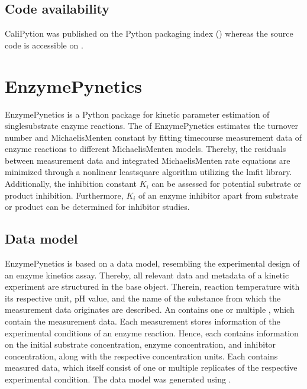 \documentclass[letterpaper,12pt,english]{jupyterBook}
\begin{document}
\subsection{Code availability}
\label{\detokenize{methods:code-availability}}
\sphinxAtStartPar
CaliPytion was published on the Python packaging index () whereas the source code is accessible on .


\section{EnzymePynetics}
\label{\detokenize{methods:enzymepynetics}}\label{\detokenize{methods:method-enzymepynetics}}
\sphinxAtStartPar
EnzymePynetics is a Python package for kinetic parameter estimation of single\sphinxhyphen{}substrate enzyme reactions. The  of EnzymePynetics estimates the turnover number and Michaelis\sphinxhyphen{}Menten constant by fitting time\sphinxhyphen{}course measurement data of enzyme reactions to different Michaelis\sphinxhyphen{}Menten models. Thereby, the residuals between measurement data and integrated Michaelis\sphinxhyphen{}Menten rate equations are minimized through a non\sphinxhyphen{}linear least\sphinxhyphen{}square algorithm utilizing the lmfit library. Additionally, the inhibition constant \(K_{i}\) can be assessed for potential substrate or product inhibition. Furthermore, \(K_{i}\) of an enzyme inhibitor apart from substrate or product can be determined for inhibitor studies.


\subsection{Data model}
\label{\detokenize{methods:enzymepynetics-datamodel}}\label{\detokenize{methods:id3}}
\sphinxAtStartPar
EnzymePynetics is based on a data model, resembling the experimental design of an enzyme kinetics assay. Thereby, all relevant data and metadata of a kinetic experiment are structured in the  base object. Therein, reaction temperature with its respective unit, pH value, and the name of the substance from which the measurement data originates are described. An  contains one or multiple , which contain the measurement data. Each measurement stores information of the experimental conditions of an enzyme reaction. Hence, each  contains information on the initial substrate concentration, enzyme concentration, and inhibitor concentration, along with the respective concentration units. Each  contains measured data, which itself consist of one or multiple replicates of the respective experimental condition. The data model was generated using .
\end{document}
